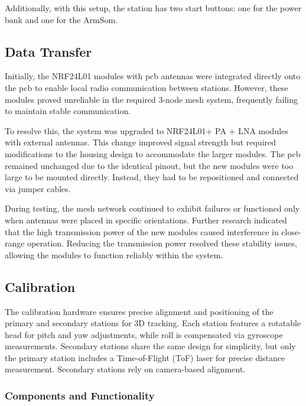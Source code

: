 Additionally, with this setup, the station has two start buttons: one for the power bank and one for the ArmSom.

\subsection{Data Transfer}

Initially, the NRF24L01 \cite{nRF24L01} modules with \acrshort{pcb} antennas were integrated directly onto the \acrshort{pcb} to enable local radio communication between stations. However, these modules proved unreliable in the required 3-node mesh system, frequently failing to maintain stable communication.

To resolve this, the system was upgraded to NRF24L01+ PA + LNA \cite{nRF24L01_plus} modules with external antennas. This change improved signal strength but required modifications to the housing design to accommodate the larger modules. The \acrshort{pcb} remained unchanged due to the identical pinout, but the new modules were too large to be mounted directly. Instead, they had to be repositioned and connected via jumper cables.

During testing, the mesh network continued to exhibit failures or functioned only when antennas were placed in specific orientations. Further research indicated that the high transmission power of the new modules caused interference in close-range operation. Reducing the transmission power resolved these stability issues, allowing the modules to function reliably within the system.

\subsection{Calibration}

The calibration hardware ensures precise alignment and positioning of the primary and secondary stations for 3D tracking. Each station features a rotatable head for pitch and yaw adjustments, while roll is compensated via gyroscope measurements. Secondary stations share the same design for simplicity, but only the primary station includes a Time-of-Flight (ToF) laser for precise distance measurement. Secondary stations rely on camera-based alignment.

\subsubsection*{Components and Functionality}

